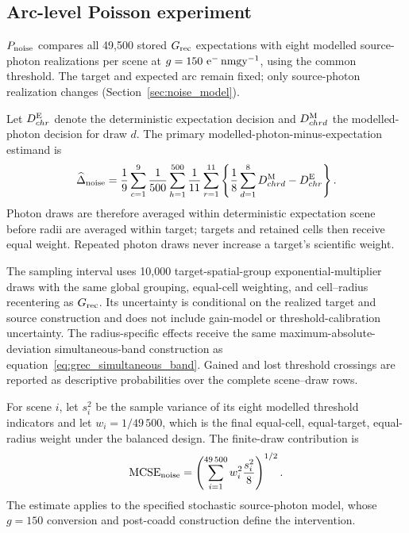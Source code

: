 \subsection{Arc-level Poisson experiment}
\label{sec:poisson_methods}

\(P_{\rm noise}\) compares all 49,500 stored \(G_{\rm rec}\) expectations
with eight modelled source-photon realizations per scene at
\(g=150\ {\rm e^{-}\,nmgy^{-1}}\), using the common threshold. The target
and expected arc remain fixed; only source-photon realization changes
(Section~\ref{sec:noise_model}).

Let \(D^{\rm E}_{chr}\) denote the deterministic expectation decision and
\(D^{\rm M}_{chrd}\) the modelled-photon decision for draw \(d\). The primary
modelled-photon-minus-expectation estimand is
\begin{equation}
\widehat\Delta_{\rm noise}
=\frac{1}{9}\sum_{c=1}^{9}\frac{1}{500}\sum_{h=1}^{500}
 \frac{1}{11}\sum_{r=1}^{11}
 \left\{\frac{1}{8}\sum_{d=1}^{8}D^{\rm M}_{chrd}-D^{\rm E}_{chr}\right\}.
\label{eq:pnoise_risk_difference}
\end{equation}
Photon draws are therefore averaged within deterministic expectation scene
before radii are averaged within target; targets and retained cells then
receive equal weight. Repeated photon draws never increase a target's
scientific weight.

The sampling interval uses 10,000 target-spatial-group exponential-multiplier
draws with the same global grouping, equal-cell weighting, and cell--radius
recentering as \(G_{\rm rec}\). Its uncertainty is conditional on the
realized target and source construction and does not include gain-model or
threshold-calibration uncertainty. The radius-specific effects receive the
same maximum-absolute-deviation simultaneous-band construction as
equation~\eqref{eq:grec_simultaneous_band}. Gained and lost threshold
crossings are reported as descriptive probabilities over the complete
scene--draw rows.

For scene \(i\), let \(s_i^2\) be the sample variance of its eight modelled
threshold indicators and let \(w_i=1/49\,500\), which is the final
equal-cell, equal-target, equal-radius weight under the balanced design. The
finite-draw contribution is
\begin{equation}
 {\rm MCSE}_{\rm noise}
 =\left(\sum_{i=1}^{49\,500}w_i^2\frac{s_i^2}{8}\right)^{1/2}.
\label{eq:pnoise_mcse}
\end{equation}
The estimate applies to the specified stochastic source-photon model, whose
\(g=150\) conversion and post-coadd construction define the intervention.

